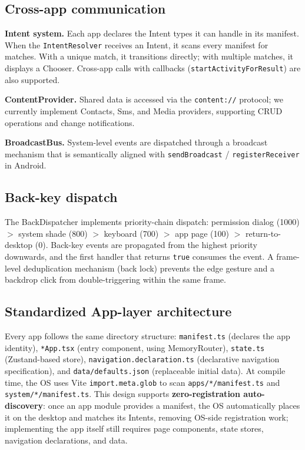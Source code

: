 \documentclass{llmxive}
\begin{document}
\subsection{Cross-app communication}

\textbf{Intent system.} Each app declares the Intent types it can handle in its manifest. When the \texttt{IntentResolver} receives an Intent, it scans every manifest for matches. With a unique match, it transitions directly; with multiple matches, it displays a Chooser. Cross-app calls with callbacks (\texttt{startActivityForResult}) are also supported.

\textbf{ContentProvider.} Shared data is accessed via the \texttt{content://} protocol; we currently implement Contacts, Sms, and Media providers, supporting CRUD operations and change notifications.

\textbf{BroadcastBus.} System-level events are dispatched through a broadcast mechanism that is semantically aligned with \texttt{sendBroadcast} / \texttt{registerReceiver} in Android.

\subsection{Back-key dispatch}

The BackDispatcher implements priority-chain dispatch: permission dialog (1000) $>$ system shade (800) $>$ keyboard (700) $>$ app page (100) $>$ return-to-desktop (0). Back-key events are propagated from the highest priority downwards, and the first handler that returns \texttt{true} consumes the event. A frame-level deduplication mechanism (back lock) prevents the edge gesture and a backdrop click from double-triggering within the same frame.

\subsection{Standardized App-layer architecture}

Every app follows the same directory structure: \texttt{manifest.ts} (declares the app identity), \texttt{*App.tsx} (entry component, using MemoryRouter), \texttt{state.ts} (Zustand-based store), \texttt{navigation.declaration.ts} (declarative navigation specification), and \texttt{data/defaults.json} (replaceable initial data). At compile time, the OS uses Vite \texttt{import.meta.glob} to scan \texttt{apps/*/manifest.ts} and \texttt{system/*/manifest.ts}. This design supports \textbf{zero-registration auto-discovery}: once an app module provides a manifest, the OS automatically places it on the desktop and matches its Intents, removing OS-side registration work; implementing the app itself still requires page components, state stores, navigation declarations, and data.
\end{document}
